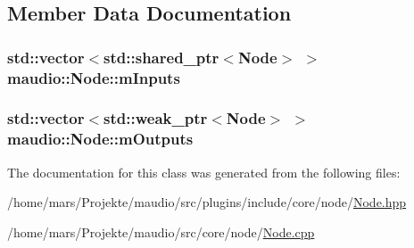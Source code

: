 \subsection{Member Data Documentation}
\hypertarget{classmaudio_1_1Node_affc36c6e75daffd04ef638cab22d84a0}{
\subsubsection[{m\-Inputs}]{\setlength{\rightskip}{0pt plus 5cm}std\-::vector$<$std\-::shared\-\_\-ptr$<${\bf Node}$>$ $>$ maudio\-::\-Node\-::m\-Inputs\hspace{0.3cm}{\ttfamily [protected]}}}\label{classmaudio_1_1Node_affc36c6e75daffd04ef638cab22d84a0}
\hypertarget{classmaudio_1_1Node_a75658f4f37faf14b438a95b7d8d60048}{
\subsubsection[{m\-Outputs}]{\setlength{\rightskip}{0pt plus 5cm}std\-::vector$<$std\-::weak\-\_\-ptr$<${\bf Node}$>$ $>$ maudio\-::\-Node\-::m\-Outputs\hspace{0.3cm}{\ttfamily [protected]}}}\label{classmaudio_1_1Node_a75658f4f37faf14b438a95b7d8d60048}


The documentation for this class was generated from the following files\-:\begin{DoxyCompactItemize}
\item 
/home/mars/\-Projekte/maudio/src/plugins/include/core/node/\hyperlink{Node_8hpp}{Node.\-hpp}\item 
/home/mars/\-Projekte/maudio/src/core/node/\hyperlink{core_2node_2Node_8cpp}{Node.\-cpp}\end{DoxyCompactItemize}
